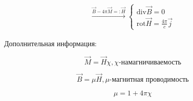 \[
\begin{aligned}
    \overset{\vec{B}-4\pi\vec{M}=:\vec{H}}{\rightarrow}
    \boxed{\begin{cases}
        \mathrm{div}\vec{B}=0 \\
        \mathrm{rot}\vec{H}= \frac{4\pi}{c}\vec{j}
    \end{cases}
    }
\end{aligned}
\]

Дополнительная информация:

\[
\vec{M}=\vec{H}\chi, \chi \text{-намагничиваемость} 
\]

\[
\vec{B}=\mu \vec{H}, \mu \text{-магнитная проводимость}
\]

\[
\mu=1+4\pi\chi
\]